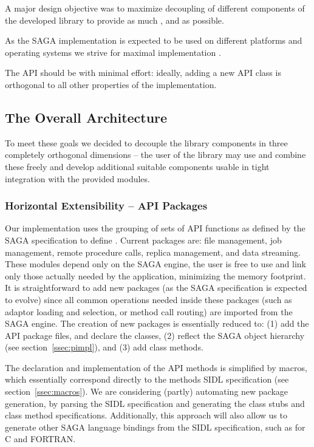 	A major design
	objective was to maximize decoupling of different components
	of the developed library to provide  as much , 
	 and  as possible.

	As the SAGA implementation is expected to be used on different platforms
	and operating systems we strive for maximal implementation . 

  The API should be  with minimal effort: ideally,
  adding a new API class is orthogonal to all other properties of the
  implementation.


\subsection{The Overall Architecture}

	To meet these goals we decided to decouple the library components
	in three completely orthogonal dimensions -- 
	the user of the library may use and combine these freely and 
	develop additional suitable components usable in tight integration with 
	the provided modules.

\subsubsection{Horizontal Extensibility -- API Packages}
\label{ssec:apipackages}

  Our implementation uses the grouping of sets of API functions as defined
  by the SAGA specification to define .	 
  Current packages are: file management, job management,
  remote procedure calls, replica management, and data streaming. 
  These modules depend only on the SAGA engine, the user is free to
  use and link only those actually needed by the application,
  minimizing the memory footprint.
  It is straightforward to add new packages (as the SAGA specification 
  is expected to evolve) since all common
  operations needed inside these packages (such as adaptor loading and
  selection, or method call routing) are imported from the SAGA
  engine.  The creation of new packages is essentially reduced to:
  (1) add the API package files, and declare the classes, (2) reflect the 
  SAGA object hierarchy (see section~\ref{ssec:pimpl}), and (3) add class 
  methods.

  The declaration and implementation of the API methods is simplified by
  macros, which essentially correspond directly to the methods
  SIDL specification (see section~\ref{ssec:macros}).  We are
  considering (partly) automating new package generation, by parsing
  the SIDL specification and generating the class stubs and class
  method specifications.  
  Additionally, this approach will also allow us to generate
  other SAGA language bindings from the SIDL specification, such as
  for C and FORTRAN.
  

